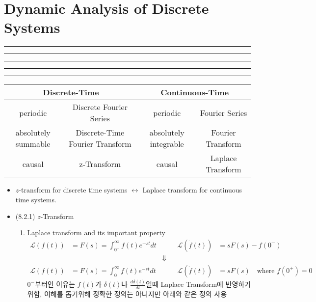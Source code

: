 \setcounter{chapter}{7}
\setcounter{section}{1}
\section{Dynamic Analysis of Discrete Systems}
\vspace{-8pt} \hrule \hrule \hrule \hrule \hrule  \vspace{12pt}


\begin{table}[!h]
\centering

\begin{tabular}{|cccc|}
\hline

\multicolumn{2}{|c|}{Discrete-Time}                                      & \multicolumn{2}{c|}{Continuous-Time}   \\ \hline
\multicolumn{1}{|c|}{periodic}              & \multicolumn{1}{c|}{Discrete Fourier Series}         & \multicolumn{1}{c|}{periodic}            & Fourier Series    \\ \hline
\multicolumn{1}{|c|}{absolutely summable} & \multicolumn{1}{c|}{Discrete-Time Fourier Transform} & \multicolumn{1}{c|}{absolutely integrable} & Fourier Transform \\ \hline
\multicolumn{1}{|c|}{causal}                & \multicolumn{1}{c|}{z-Transform}                     & \multicolumn{1}{c|}{causal}              & Laplace Transform \\ \hline
\end{tabular}
\end{table}
\begin{itemize}
	\item $z$-transform for discrete time systems $\leftrightarrow$ Laplace transform for continuous time systems. 
\item (8.2.1) $z$-Transform 
	\begin{enumerate}
		\item Laplace transform and its important property 
		\begin{align*}
			\mathcal{L} (f(t))&= F(s) = \int_{0^-}^{\infty} f(t) e^{-st} dt 
			&&&
			\mathcal{L}(\dot{f}(t)) &= sF(s) -f(0^{-})\\
			&&\Downarrow&
			\\
						\mathcal{L} (f(t))&= F(s) = \int_0^{\infty} f(t) e^{-st} dt 
			&&&
			\mathcal{L}(\dot{f}(t)) &= sF(s) \text{ } \text{ where $f(0^+) = 0$}
		\end{align*}
		$0^{-}$부터인 이유는 $f(t)$가 $\delta(t)$나 $\frac{d\delta(t)}{dt}$일때 Laplace Transform에 반영하기 위함, 이해를 돕기위해 정확한 정의는 아니지만 아래와 같은 정의 사용
	\end{enumerate}	
\end{itemize}

